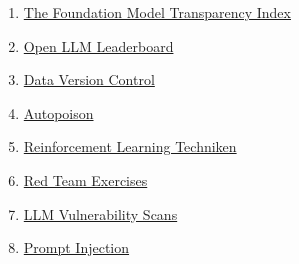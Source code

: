 \documentclass[
]{article}
\begin{document}
\begin{enumerate}
{  Poisoning}
\item
  \href{https://crfm.stanford.edu/fmti/}{The Foundation Model
  Transparency Index}
\item
  \href{https://huggingface.co/spaces/HuggingFaceH4/open_llm_leaderboard}{Open
  LLM Leaderboard}
\item
  \href{https://dvc.org/doc/user-guide/analytics}{Data Version Control}
\item
  \href{https://github.com/azshue/AutoPoison}{Autopoison}
\item
  \href{https://wandb.ai/ayush-thakur/Intro-RLAIF/reports/An-Introduction-to-Training-LLMs-Using-Reinforcement-Learning-From-Human-Feedback-RLHF---VmlldzozMzYyNjcy}{Reinforcement
  Learning Techniken}
\item
  \href{https://www.anthropic.com/index/red-teaming-language-models-to-reduce-harms-methods-scaling-behaviors-and-lessons-learned}{Red
  Team Exercises}
\item
  \href{https://github.com/leondz/garak}{LLM Vulnerability Scans}
\item
  \href{https://github.com/OWASP/www-project-top-10-for-large-language-model-applications/blob/main/1_0_vulns/PromptInjection.md}{Prompt
  Injection}
\end{enumerate}
\end{document}
